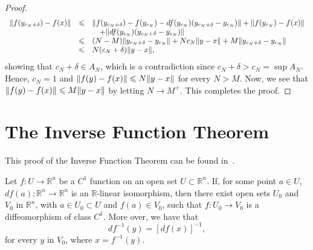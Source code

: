 \begin{proof}
	\[
		\begin{array}{rcl}
			\lVert f(y_{c_{N}+\delta})-f(x)\rVert
			 & \leqslant &
			\lVert f(y_{c_{N}+\delta})-f(y_{c_{N}})-df(y_{c_{N}})(y_{c_{N}+\delta}-y_{c_{N}})\rVert
			+
			\lVert f(y_{c_{N}})-f(x)\rVert
			\\
			 &           & \quad
			+
			\lVert df(y_{c_{N}})(y_{c_{N}+\delta}-y_{c_{N}})\rVert
			\\
			 & \leqslant &
			(N-M)\lVert y_{c_{N}+\delta}-y_{c_{N}}\rVert
			+
			Nc_{N}\lVert y-x\rVert
			+
			M\lVert y_{c_{N}+\delta}-y_{c_{N}}\rVert
			\\
			 & \leqslant &
			N(c_{N}+\delta)\lVert y-x\rVert,
		\end{array}
	\]
	showing that \({c_{N}+\delta}\in{A_{N}}\), which is a contradiction since
	\(c_{N}+\delta>c_{N}=\sup{A_{N}}\). Hence, \(c_{N}=1\) and
	\(\lVert f(y)-f(x)\rVert\leqslant{N\lVert y-x\rVert}\) for every \(N>M\). Now, we see that
	\(\lVert f(y)-f(x)\rVert\leqslant{M\lVert y-x\rVert}\) by letting \({N}\to{M^{+}}\). This
	completes the proof.
\end{proof}

\section{The Inverse Function Theorem}\label{sec:the_inverse_function_theorem}

This proof of the Inverse Function Theorem can be found in~\cite{lang2012real}.

\begin{theorem}\label{thm:the-inverse-function-theorem}
	Let \(f:U\to\mathbb{R}^{n}\) be a \(C^{1}\) function on an open set
	\({U}\subset{\mathbb{R}^{n}}\). If, for some point \({a}\in{U}\),
	\(df(a):\mathbb{R}^{n}\to\mathbb{R}^{n}\) is an \(\mathbb{R}\)-linear
	isomorphism, then there exist open sets \(U_{0}\) and \(V_{0}\) in
	\(\mathbb{R}^{n}\), with \({a}\in{U_{0}}\subset{U}\) and \({f(a)}\in{V_{0}}\),
	such that \(f:U_{0}\to{V_{0}}\) is a diffeomorphism of class \(C^{1}\). More
	over, we have that
	\[
		df^{-1}(y)=[df(x)]^{-1},
	\]
	for every \(y\) in \(V_{0}\), where \(x=f^{-1}(y)\).
\end{theorem}

